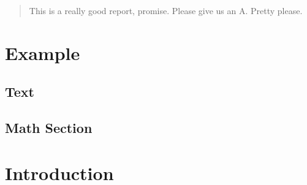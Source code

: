 \documentclass[12pt, fleqn]{report}
\begin{document}
\begingroup
\thispagestyle{empty}

\endgroup


\begin{abstract}
This is a really good report, promise. Please give us an A. Pretty please.
\end{abstract}

\usechapterimagefalse


\printnomenclature


\pagestyle{empty}
\tableofcontents
\pagestyle{fancy}

\usechapterimagetrue
{}

\chapter{Example} \label{cha:example}
\section{Text} \label{sec:text}
\lipsum[1-7]
\section{Math Section} \label{sec:math_section}
\blindmathpaper



\chapter{Introduction}\label{cha:introduction}


% 

% 

% 
\end{document}
